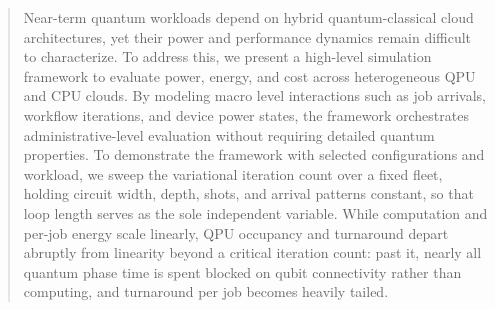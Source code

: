 \begin{abstract}


Near-term quantum workloads depend on hybrid quantum-classical cloud architectures, yet their power and performance dynamics remain difficult to characterize. To address this, we present a high-level simulation framework to evaluate power, energy, and cost across heterogeneous QPU and CPU clouds. By modeling macro level interactions such as job arrivals, workflow iterations, and device power states, the framework orchestrates administrative-level evaluation without requiring detailed quantum properties. To demonstrate the framework with selected configurations and workload, we sweep the variational iteration count over a fixed fleet, holding circuit width, depth, shots, and arrival patterns constant, so that loop length serves as the sole independent variable. While computation and per-job energy scale linearly, QPU occupancy and turnaround depart abruptly from linearity beyond a critical iteration count: past it, nearly all quantum phase time is spent blocked on qubit connectivity rather than computing, and turnaround per job becomes heavily tailed.

\end{abstract}
